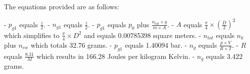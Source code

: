 The equations provided are as follows:

- \( p_{g1} \) equals \( \frac{z}{2} \).
- \( n_{g1} \) equals \( \frac{z}{2} \).
- \( p_{g1} \) equals \( p_0 \) plus \( \frac{n_{tot} \times g}{m \times A} \).
- \( A \) equals \( \frac{\pi}{4} \times \left( \frac{D}{2} \right)^2 \) which simplifies to \( \frac{\pi}{4} \times D^2 \) and equals 0.00785398 square meters.
- \( n_{tot} \) equals \( n_{k} \) plus \( n_{cw} \) which totals 32.76 grams.
- \( p_{g1} \) equals 1.40094 bar.
- \( n_{g} \) equals \( \frac{p \times V}{R \times T} \).
- \( R \) equals \( \frac{8.31}{M} \) which results in 166.28 Joules per kilogram Kelvin.
- \( n_{g} \) equals 3.422 grams.